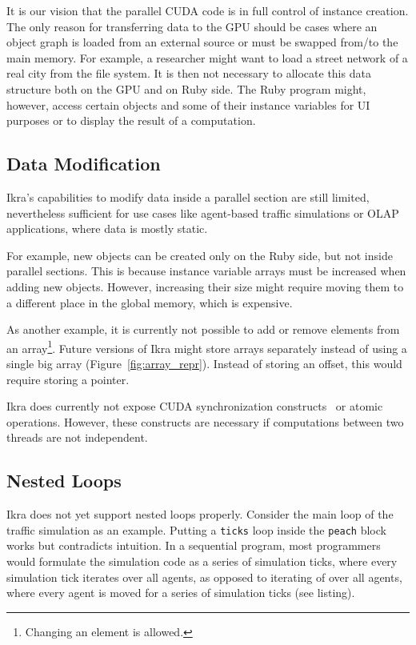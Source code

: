 \documentclass[preprint]{sigplanconf}
\begin{document}
It is our vision that the parallel CUDA code is in full control of instance creation. The only reason for transferring data to the GPU should be cases where an object graph is loaded from an external source or must be swapped from/to the main memory. For example, a researcher might want to load a street network of a real city from the file system. It is then not necessary to allocate this data structure both on the GPU and on Ruby side. The Ruby program might, however, access certain objects and some of their instance variables for UI purposes or to display the result of a computation.

\subsection{Data Modification}
\label{sec:gen_new_obj}
Ikra's capabilities to modify data inside a parallel section are still limited, nevertheless sufficient for use cases like agent-based traffic simulations or OLAP applications, where data is mostly static.

For example, new objects can be created only on the Ruby side, but not inside parallel sections. This is because instance variable arrays must be increased when adding new objects. However, increasing their size might require moving them to a different place in the global memory, which is expensive.

As another example, it is currently not possible to add or remove elements from an array\footnote{Changing an element is allowed.}. Future versions of Ikra might store arrays separately instead of using a single big array (Figure~\ref{fig:array_repr}). Instead of storing an offset, this would require storing a pointer.

Ikra does currently not expose CUDA synchronization constructs~\cite{gpusync} or atomic operations. However, these constructs are necessary if computations between two threads are not independent.

\balance

\subsection{Nested Loops}
\label{sec:nested_loops}
Ikra does not yet support nested loops properly. Consider the main loop of the traffic simulation as an example. Putting a \texttt{ticks} loop inside the \texttt{peach} block works but contradicts intuition. In a sequential program, most programmers would formulate the simulation code as a series of simulation ticks, where every simulation tick iterates over all agents, as opposed to iterating of over all agents, where every agent is moved for a series of simulation ticks (see listing).
\end{document}
